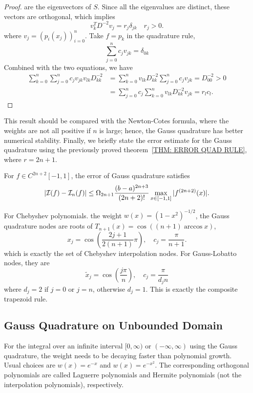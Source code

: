 \begin{proof}
   are the eigenvectors of $S$. Since all the eigenvalues are distinct, these vectors are orthogonal, which implies 
   \begin{equation}
       v_k^T  D^{-2} v_j = r_j \delta_{jk}\quad r_j > 0.
   \end{equation}
   where $v_{j} = (p_i(x_j))_{i=0}^n $. Take $f = p_k$ in the quadrature rule, 
   \begin{equation}
       \sum_{j = 0}^n c_j v_{jk} 
 = \delta_{0k}
   \end{equation}
   Combined with the two equations, we have 
   \begin{equation}
    \begin{aligned}
        \sum_{k=0}^{n}\sum_{j = 0}^n c_j v_{jk} v_{lk} D_{kk}^{-2} &=   \sum_{k=0}^{n} v_{lk} D_{kk}^{-2} \sum_{j = 0}^n c_j v_{jk} =  D_{00}^{-2} > 0 \\
        &=     \sum_{j = 0}^n c_j \sum_{k=0}^{n} v_{lk} D_{kk}^{-2}  v_{jk} = r_l  c_l.
    \end{aligned}
   \end{equation}
\end{proof}
This result should be compared with the Newton-Cotes formula, where the weights are not all positive if $n$ is large; hence, the Gauss quadrature has better numerical stability. 
Finally, we briefly state the error estimate for the Gauss quadrature using the previously proved theorem~\ref{THM: ERROR QUAD RULE}, where $r = 2n+1$.
\begin{corollary}
    For $f \in C^{2n+2}[-1,1]$, the error of Gauss quadrature satisfies 
    \begin{equation}
        |\mathcal I(f) -\mathcal I_n(f)| \le \Omega_{2n+1} \frac{(b-a)^{2n+3}}{(2n+2)!}\max_{x\in[-1,1]}|f^{(2n+2)}(x)|.
    \end{equation}
\end{corollary}
\begin{remark}
    For Chebyshev polynomials. the weight $w(x) = (1- x^2)^{-1/2}$, the Gauss quadrature nodes are roots of $T_{n+1}(x) = \cos((n+1)\arccos x)$,
$$x_j = \cos\left(\frac{2j+1}{2(n+1)}\pi\right), \quad c_j = \frac{\pi}{n+1}.$$ 
which is exactly the set of Chebyshev interpolation nodes. For Gauss-Lobatto nodes, they are 
$$\tilde{x}_j = \cos\left(   \frac{j \pi}{n}\right),\quad c_j = \frac{\pi}{d_jn}$$
where $d_j = 2$ if $j = 0$ or $j = n$, otherwise $d_j = 1$. This is exactly the composite trapezoid rule. 
\end{remark}

\subsection{Gauss Quadrature on Unbounded Domain}
For the integral over an infinite interval $[0, \infty)$ or $(-\infty, \infty)$ using the Gauss quadrature, the weight needs to be decaying faster than polynomial growth. Usual choices are $w(x) = e^{-x}$ and $w(x) = e^{-x^2}$. The corresponding orthogonal polynomials are called Laguerre polynomials and Hermite polynomials (not the interpolation polynomials), respectively.


